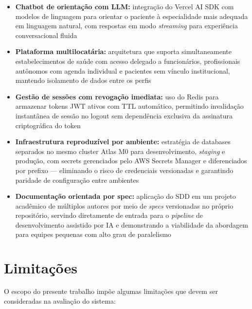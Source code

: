 \begin{itemize}
  \item \textbf{Chatbot de orientação com LLM:} integração
        do Vercel AI SDK com modelos de linguagem para
        orientar o paciente à especialidade mais
        adequada em linguagem natural, com respostas
        em modo \textit{streaming} para experiência
        conversacional fluida

  \item \textbf{Plataforma multilocatária:} arquitetura
        que suporta simultaneamente estabelecimentos de saúde com acesso
        delegado a funcionários, profissionais autônomos
        com agenda individual e pacientes sem vínculo
        institucional, mantendo isolamento de dados
        entre os perfis

  \item \textbf{Gestão de sessões com revogação
        imediata:} uso do Redis para armazenar tokens
        JWT ativos com TTL automático, permitindo
        invalidação instantânea de sessão no logout
        sem dependência exclusiva da assinatura
        criptográfica do token

  \item \textbf{Infraestrutura reproduzível por
        ambiente:} estratégia de databases separados
        no mesmo cluster Atlas M0 para desenvolvimento,
        \textit{staging} e produção, com secrets
        gerenciados pelo AWS Secrets Manager e
        diferenciados por prefixo — eliminando o risco
        de credenciais versionadas e garantindo
        paridade de configuração entre ambientes

  \item \textbf{Documentação orientada por spec:}
        aplicação do SDD em um projeto acadêmico de
        múltiplos autores por meio de \textit{specs}
        versionadas no próprio repositório, servindo
        diretamente de entrada para o \textit{pipeline}
        de desenvolvimento assistido por IA e
        demonstrando a viabilidade da abordagem para
        equipes pequenas com alto grau de paralelismo
\end{itemize}

\section{Limitações}
\label{sec:limitations}

O escopo do presente trabalho impõe algumas limitações
que devem ser consideradas na avaliação do sistema:

